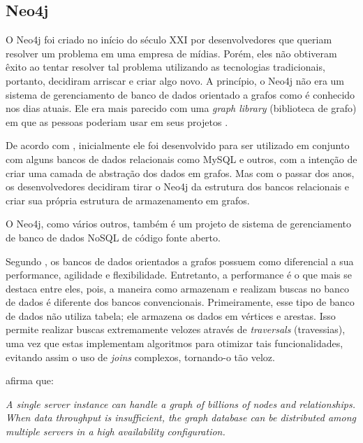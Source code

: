 \subsection{Neo4j}

\par O Neo4j foi criado no início do século XXI por desenvolvedores que queriam resolver um problema em uma empresa de mídias. Porém, eles não obtiveram êxito ao tentar resolver tal problema utilizando as tecnologias tradicionais, portanto, decidiram arriscar e criar algo novo. A princípio, o Neo4j não era um sistema de gerenciamento de banco de dados orientado a grafos como é conhecido nos dias atuais. Ele era mais parecido com uma \textit{graph library} (biblioteca de grafo) em que as pessoas poderiam usar em seus projetos \cite{bruggen_learning_neo4j}.

\par De acordo com , inicialmente ele foi desenvolvido para ser utilizado em conjunto com alguns bancos de dados relacionais como MySQL e outros, com a intenção de criar uma camada de abstração dos dados em grafos. Mas com o passar dos anos, os desenvolvedores decidiram tirar o Neo4j da estrutura dos bancos relacionais e criar sua própria estrutura de armazenamento em grafos.

\par O Neo4j, como vários outros, também é um projeto de sistema de gerenciamento de banco de dados NoSQL de código fonte aberto.

\par Segundo , os bancos de dados orientados a grafos possuem como diferencial a sua performance, agilidade e flexibilidade. Entretanto, a performance é o que mais se destaca entre eles, pois, a maneira como armazenam e realizam buscas no banco de dados é diferente dos bancos convencionais. Primeiramente, esse tipo de banco de dados não utiliza tabela; ele armazena os dados em vértices e arestas. Isso permite realizar buscas extremamente velozes através de \textit{traversals} (travessias), uma vez que estas implementam algoritmos para otimizar tais funcionalidades, evitando assim o uso de \textit{joins} complexos, tornando-o tão veloz.

\par {} afirma que:

\begin{citacao}
	\textit{A single server instance can handle a graph of billions of nodes and relationships. When data throughput is insufficient, the graph database can be distributed among multiple servers in a high availability configuration.}\footnotemark[11]
\end{citacao}

